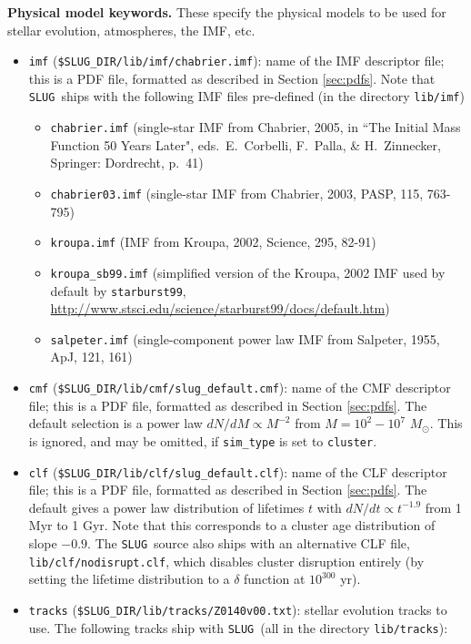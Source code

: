 \documentclass[12pt]{article}
\newcommand{\slug}{\texttt{SLUG}}
\begin{document}
\noindent
\textbf{Physical model keywords.} These specify the physical models to be used for stellar evolution, atmospheres, the IMF, etc.
\begin{itemize}
\item \verb=imf= (\verb=$SLUG_DIR/lib/imf/chabrier.imf=): name of the IMF descriptor file; this is a PDF file, formatted as described in Section \ref{sec:pdfs}. Note that \slug\ ships with the following IMF files pre-defined (in the directory \verb=lib/imf=)
\begin{itemize}
\item \verb=chabrier.imf= (single-star IMF from Chabrier, 2005, in ``The Initial Mass Function 50 Years Later", eds.~E.~Corbelli, F.~Palla, \& H.~Zinnecker, Springer: Dordrecht, p.~41)
\item \verb=chabrier03.imf= (single-star IMF from Chabrier, 2003, PASP, 115, 763-795)
\item \verb=kroupa.imf= (IMF from Kroupa, 2002, Science, 295, 82-91)
\item \verb=kroupa_sb99.imf= (simplified version of the Kroupa, 2002 IMF used by default by \verb=starburst99=, \url{http://www.stsci.edu/science/starburst99/docs/default.htm})
\item \verb=salpeter.imf= (single-component power law IMF from Salpeter, 1955, ApJ, 121, 161)
\end{itemize}
\item \verb=cmf= (\verb=$SLUG_DIR/lib/cmf/slug_default.cmf=): name of the CMF descriptor file; this is a PDF file, formatted as described in Section \ref{sec:pdfs}. The default selection is a power law $dN/dM \propto M^{-2}$ from $M= 10^2 - 10^7$ $M_\odot$. This is ignored, and may be omitted, if \verb=sim_type= is set to \verb=cluster=.
\item \verb=clf= (\verb=$SLUG_DIR/lib/clf/slug_default.clf=): name of the CLF descriptor file; this is a PDF file, formatted as described in Section \ref{sec:pdfs}. The default gives a power law distribution of lifetimes $t$ with $dN/dt\propto t^{-1.9}$ from 1 Myr to 1 Gyr. Note that this corresponds to a cluster age distribution of slope $-0.9$. The \slug\ source also ships with an alternative CLF file, \verb=lib/clf/nodisrupt.clf=, which disables cluster disruption entirely (by setting the lifetime distribution to a $\delta$ function at $10^{300}$ yr).
\item \verb=tracks= (\verb=$SLUG_DIR/lib/tracks/Z0140v00.txt=): stellar evolution tracks to use. The following tracks ship with \slug\ (all in the directory \verb=lib/tracks=):

\end{itemize}
\end{document}
